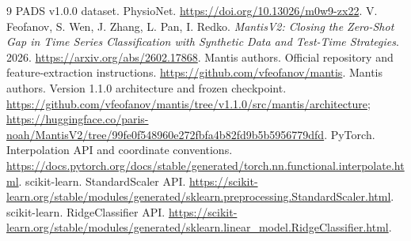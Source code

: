 \documentclass[11pt,a4paper]{article}
\numberwithin{equation}{section}
\begin{document}
\clearpage
\begin{thebibliography}{9}\small
{} PADS v1.0.0 dataset. PhysioNet.
 \url{https://doi.org/10.13026/m0w9-zx22}.
 V. Feofanov, S. Wen, J. Zhang, L. Pan, I. Redko.
 \emph{MantisV2: Closing the Zero-Shot Gap in Time Series Classification
 with Synthetic Data and Test-Time Strategies}. 2026.
 \url{https://arxiv.org/abs/2602.17868}.
 Mantis authors. Official repository and feature-extraction instructions.
 \url{https://github.com/vfeofanov/mantis}.
 Mantis authors. Version 1.1.0 architecture and frozen checkpoint.
 \url{https://github.com/vfeofanov/mantis/tree/v1.1.0/src/mantis/architecture};
 \url{https://huggingface.co/paris-noah/MantisV2/tree/99fe0f548960e272fbfa4b82fd9b5b5956779dfd}.
 PyTorch. Interpolation API and coordinate conventions.
 \url{https://docs.pytorch.org/docs/stable/generated/torch.nn.functional.interpolate.html}.
 scikit-learn. StandardScaler API.
 \url{https://scikit-learn.org/stable/modules/generated/sklearn.preprocessing.StandardScaler.html}.
 scikit-learn. RidgeClassifier API.
 \url{https://scikit-learn.org/stable/modules/generated/sklearn.linear_model.RidgeClassifier.html}.
\end{thebibliography}
\end{document}
